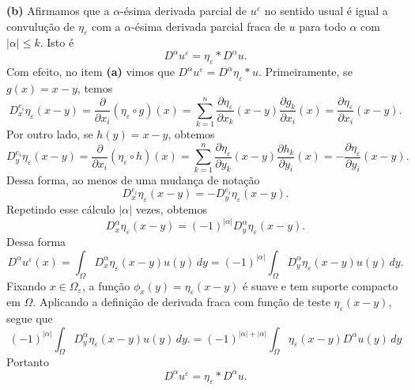 \documentclass[a4paper, 11pt]{book}
\theoremstyle{definition}
\begin{document}
\begin{prf}
    \textbf{(b)} Afirmamos que a $\alpha$-ésima derivada parcial de $u^\varepsilon$ no sentido usual é igual a convulução de $\eta_\varepsilon$ com a $\alpha$-ésima derivada parcial fraca de $u$ para todo $\alpha$ com $|\alpha| \leqslant k$. 
    Isto é
    \[
        D^\alpha u^\varepsilon = \eta_\varepsilon * D^\alpha u.
    \]
    Com efeito, no item \textbf{(a)} vimos que $D^\alpha u^\varepsilon = D^\alpha \eta_\varepsilon * u$. Primeiramente, se $g(x) = x - y$, temos
    \[
        D^{e_i}_x \eta_\varepsilon (x -y) = \dfrac{\partial}{\partial x_i} (\eta_\varepsilon \circ g)(x) = \sum_{k=1}^n \dfrac{\partial \eta_\varepsilon}{\partial x_k} (x - y) \dfrac{\partial g_k}{\partial x_i}(x) = \dfrac{\partial \eta_\varepsilon}{\partial x_i}(x-y).
    \]
    Por outro lado, se $h(y) = x - y$, obtemos
    \[
        D^{e_i}_y \eta_\varepsilon (x-y) = \dfrac{\partial}{\partial x_i} (\eta_\varepsilon \circ h)(x) = \sum_{k=1}^n \dfrac{\partial \eta_\varepsilon}{\partial y_k} (x - y) \dfrac{\partial h_k}{\partial y_i}(x) = -\dfrac{\partial \eta_\varepsilon}{\partial y_i}(x-y).
    \]
    Dessa forma, ao menos de uma mudança de notação
    \[
        D^{e_i}_x \eta_\varepsilon (x-y) = -D^{e_i}_y \eta_\varepsilon (x-y).
    \]
    Repetindo esse cálculo $|\alpha|$ vezes, obtemos
    \[
        D^\alpha_x \eta_\varepsilon (x-y) = (-1)^{|\alpha|} D^\alpha_y \eta_\varepsilon (x-y).
    \]
    Dessa forma
    \[
        D^{\alpha} u^\varepsilon (x) = \int_\Omega D^\alpha_x \eta_\varepsilon (x-y) u(y) \,dy = (-1)^{|\alpha|} \int_\Omega D^{\alpha}_y \eta_\varepsilon (x-y) u(y) \,dy.
    \]
    Fixando $x \in \Omega_\varepsilon$, a função $\phi_x(y) =\eta_\varepsilon(x-y)$ é suave e tem suporte compacto em $\Omega$.
    Aplicando a definição de derivada fraca com função de teste $\eta_\varepsilon(x-y)$, segue que
    \[
        (-1)^{|\alpha|} \int_\Omega D^{\alpha}_y \eta_\varepsilon (x-y) u(y) \,dy. = (-1)^{|\alpha| + |\alpha|}  \int_\Omega \eta_\varepsilon(x-y) D^{\alpha} u(y) \,dy
    \]
    Portanto
    \[
        D^\alpha u^\varepsilon = \eta_\varepsilon * D^\alpha u.
    \]


\end{prf}
\end{document}
